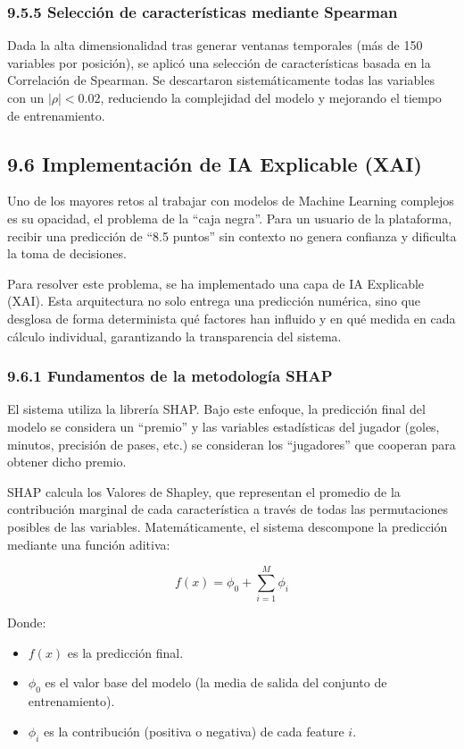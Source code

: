 \subsubsection{9.5.5 Selección de características mediante Spearman}
 
Dada la alta dimensionalidad tras generar ventanas temporales (más de 150 variables por posición), se aplicó una selección de características basada
en la Correlación de Spearman. Se descartaron sistemáticamente todas las variables
con un $|\rho| < 0.02$, reduciendo la complejidad del modelo y mejorando el tiempo de entrenamiento.
 
\subsection{9.6 Implementación de IA Explicable (XAI)}
 
Uno de los mayores retos al trabajar con modelos de Machine Learning complejos es su opacidad, el problema de la ``caja negra''. Para un usuario de la plataforma, recibir una predicción de ``8.5 puntos'' sin contexto
no genera confianza y dificulta la toma de decisiones.
 
Para resolver este problema, se ha implementado una capa de IA Explicable (XAI). Esta arquitectura no solo entrega una predicción numérica, sino que
desglosa de forma determinista qué factores han influido y en qué medida en cada cálculo individual, garantizando la transparencia del sistema.
 
\subsubsection{9.6.1 Fundamentos de la metodología SHAP}
 
El sistema utiliza la librería SHAP. Bajo este enfoque, la predicción final del modelo se
considera un ``premio'' y las variables estadísticas del jugador (goles, minutos, precisión de pases, etc.) se consideran los ``jugadores'' que cooperan
para obtener dicho premio.
 
SHAP calcula los Valores de Shapley, que representan el promedio de la contribución marginal de cada característica a través de todas las permutaciones
posibles de las variables. Matemáticamente, el sistema descompone la predicción mediante una función aditiva:
 
$$f(x) = \phi_0 + \sum_{i=1}^{M} \phi_i$$
 
Donde:
 
\begin{itemize}
\item $f(x)$ es la predicción final.
\item $\phi_0$ es el valor base del modelo (la media de salida del conjunto de entrenamiento).
\item $\phi_i$ es la contribución (positiva o negativa) de cada feature $i$.
\end{itemize}
 
